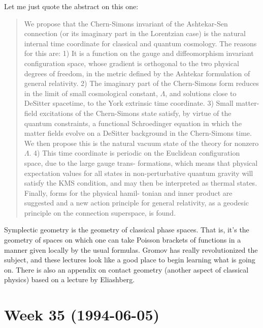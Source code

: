\documentclass{article}
\def\tightlist{}
\renewcommand{\texttt}[1]{%
  \begingroup
  \ttfamily
  \begingroup\lccode`~=`/\lowercase{\endgroup\def~}{/\discretionary{}{}{}}%
  \begingroup\lccode`~=`[\lowercase{\endgroup\def~}{[\discretionary{}{}{}}%
  \begingroup\lccode`~=`.\lowercase{\endgroup\def~}{.\discretionary{}{}{}}%
  \catcode`/=\active\catcode`[=\active\catcode`.=\active
  \scantokens{#1\noexpand}%
  \endgroup
}
\begin{document}
Let me just quote the abstract on this one:

\begin{quote}
We propose that the Chern-Simons invariant of the Ashtekar-Sen
connection (or its imaginary part in the Lorentzian case) is the natural
internal time coordinate for classical and quantum cosmology. The
reasons for this are: 1) It is a function on the gauge and
diffeomorphism invariant configuration space, whose gradient is
orthogonal to the two physical degrees of freedom, in the metric defined
by the Ashtekar formulation of general relativity. 2) The imaginary part
of the Chern-Simons form reduces in the limit of small cosmological
constant, \(\Lambda\), and solutions close to DeSitter spacetime, to the
York extrinsic time coordinate. 3) Small matter-field excitations of the
Chern-Simons state satisfy, by virtue of the quantum constraints, a
functional Schroedinger equation in which the matter fields evolve on a
DeSitter background in the Chern-Simons time. We then propose this is
the natural vacuum state of the theory for nonzero \(\Lambda\). 4) This
time coordinate is periodic on the Euclidean configuration space, due to
the large gauge trans- formations, which means that physical expectation
values for all states in non-perturbative quantum gravity will satisfy
the KMS condition, and may then be interpreted as thermal states.
Finally, forms for the physical hamil- tonian and inner product are
suggested and a new action principle for general relativity, as a
geodesic principle on the connection superspace, is found.
\end{quote}


Symplectic geometry is the geometry of classical phase spaces. That is,
it's the geometry of spaces on which one can take Poisson brackets of
functions in a manner given locally by the usual formulas. Gromov has
really revolutionized the subject, and these lectures look like a good
place to begin learning what is going on. There is also an appendix on
contact geometry (another aspect of classical physics) based on a
lecture by Eliashberg.
\hypertarget{week35}{%
\section{Week 35 (1994-06-05)}\label{week35}}
\end{document}
